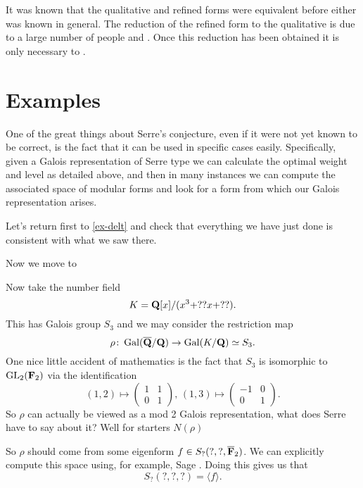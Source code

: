 \documentclass[a4paper,12pt]{article}
\begin{document}
It was known that the qualitative and refined forms were equivalent before either was known in general.
The reduction of the refined form to the qualitative is due to a large number of people and .
Once this reduction has been obtained it is only necessary to .


\section{Examples}
One of the great things about Serre's conjecture, even if it were not yet known to be correct, is the fact that it can be used in specific cases easily.
Specifically, given a Galois representation of Serre type we can calculate the optimal weight and level as detailed above, and then in many instances we can compute the associated space of modular forms and look for a form from which our Galois representation arises.

\begin{ex}
Let's return first to \cref{ex-delt} and check that everything we have just done is consistent with what we saw there.
\end{ex}

Now we move to 

\begin{ex}
Now take the number field
\[
K = \mathbf{Q}[x]/(x^3 + ??x + ??).
\]
This has Galois group $S_3$ and we may consider the restriction map
\[
\rho\colon \operatorname{Gal}(\overline{\mathbf{Q}}/\mathbf{Q}) \to \operatorname{Gal}(K/\mathbf{Q}) \simeq S_3.
\]
One nice little accident of mathematics is the fact that $S_3$ is isomorphic to $\operatorname{GL}_2(\mathbf{F}_2)$ via the identification %
\[
(1, 2) \mapsto \begin{pmatrix} 1 & 1 \\ 0 & 1 \end{pmatrix},\,
(1, 3) \mapsto \begin{pmatrix} -1 & 0 \\ 0 & 1 \end{pmatrix}.
\]
So $\rho$ can actually be viewed as a mod 2 Galois representation, what does Serre have to say about it?
Well for starters $N(\rho)$

So $\rho$ should come from some eigenform $f \in S_?(?,?,\overline{\mathbf{F}}_2)$.
We can explicitly compute this space using, for example, Sage \cite{Sage}.
Doing this gives us that
\[
S_?(?,?,?) = \langle f \rangle.
\]

\end{ex}
\end{document}

